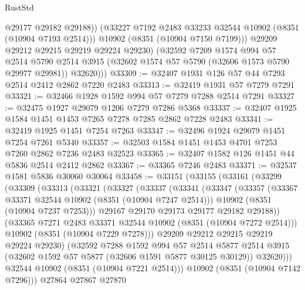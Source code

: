 \begin{lexlean}{RustStd}
\begin{coremodule}
                @29177
                @29182
                @29188))
            (@33227 @7192 @2483 @33233 @32544 @10902 (@8351 (@10904 @7193 @2514)))
            @10902
            (@8351 (@10904 @7150 @7199)))
          @29209
          @29212
          @29215
          @29219
          @29224
          @29230)
        (@32592
          @7209
          @1574
          @994
          @57
          @2514
          @5790
          @2514
          @3915
          (@32602 @1574 @57 @5790 (@32606 @1573 @5790 @29977 @29981))
          @32620)))
@33309 := @32407 @1931 @126 @57 @44 @7293 @2514 @2412 @2862 @7220 @2483
@33313 := @32419 @1931 @57 @7279 @7291
@33321 := @32466 @1928 @1592 @994 @57 @7279 @7288 @2514 @7291
@33327 := @32475 @1927 @29079 @1206 @7279 @7286 @5368
@33337 := @32407 @1925 @1584 @1451 @1453 @7265 @7278 @7285 @2862 @7228 @2483
@33341 := @32419 @1925 @1451 @7254 @7263
@33347 := @32496 @1924 @29079 @1451 @7254 @7261 @5340
@33357 := @32503 @1584 @1451 @1453 @4701 @7253 @7260 @2862 @7236 @2483 @32523
@33365 := @32407 @1582 @126 @1451 @44 @5836 @2514 @2412 @2862
@33367 := @33365 @7246 @2483
@33371 := @32537 @1581 @5836 @30060 @30064
@33458 := @33151
    (@33155
      (@33161
        (@33299
          (@33309
            (@33313
              (@33321
                (@33327
                  (@33337
                    (@33341
                      (@33347
                        (@33357
                          (@33367 @33371 @32544 @10902 (@8351 (@10904 @7247 @2514)))
                          @10902
                          (@8351 (@10904 @7237 @7253)))
                        @29167
                        @29170
                        @29173
                        @29177
                        @29182
                        @29188))
                    (@33365 @7271 @2483 @33371 @32544 @10902 (@8351 (@10904 @7272 @2514)))
                    @10902
                    (@8351 (@10904 @7229 @7278)))
                  @29209
                  @29212
                  @29215
                  @29219
                  @29224
                  @29230)
                (@32592
                  @7288
                  @1592
                  @994
                  @57
                  @2514
                  @5877
                  @2514
                  @3915
                  (@32602 @1592 @57 @5877 (@32606 @1591 @5877 @30125 @30129))
                  @32620)))
            @32544
            @10902
            (@8351 (@10904 @7221 @2514)))
          @10902
          (@8351 (@10904 @7142 @7296)))
        @27864
        @27867
        @27870

\end{coremodule}
\end{lexlean}
